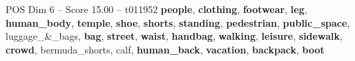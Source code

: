 \begin{textsample}{POS Dim 6 – Score 15.00 – t011952}  \label{ex:f6_pos_031}
\textbf{people}, \textbf{clothing}, \textbf{footwear}, \textbf{leg}, \textbf{human\_body}, \textbf{temple}, \textbf{shoe}, \textbf{shorts}, \textbf{standing}, \textbf{pedestrian}, \textbf{public\_space}, luggage\_\&\_bags, \textbf{bag}, \textbf{street}, \textbf{waist}, \textbf{handbag}, \textbf{walking}, \textbf{leisure}, \textbf{sidewalk}, \textbf{crowd}, bermuda\_shorts, calf, \textbf{human\_back}, \textbf{vacation}, \textbf{backpack}, \textbf{boot}

\end{textsample}
